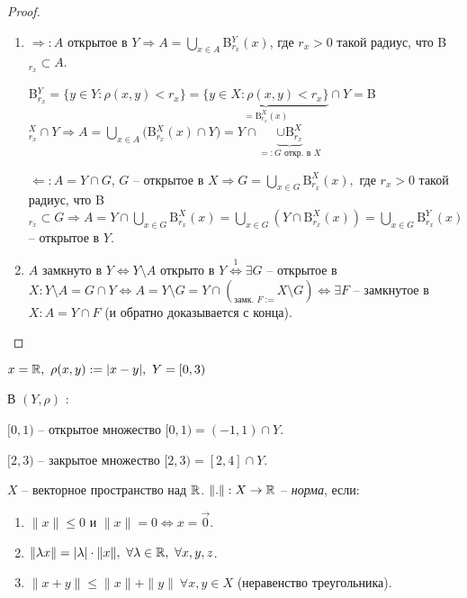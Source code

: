 \begin{proof}
    \begin{enumerate}
        \item $\Rightarrow:A$ открытое в $Y\Rightarrow A=\bigcup\limits_{x\in A}$B$_{r_x}^Y(x)$, где $r_x>0$ такой радиус, что B$_{r_x}\subset A$.

        B$_{r_x}^Y=\{y\in Y:\rho(x,y)<r_x\}=\underbrace{\{y\in X:\rho(x,y)<r_x\}}_{=\text{B}^X_{r_x}(x)}\cap Y=$B$_{r_x}^X\cap Y\Rightarrow A = \bigcup\limits_{x\in A}($B$_{r_x}^X(x)\cap Y)=Y\cap \underbrace{\cup\text{B}^X_{r_x}}_{=:G\text{ откр. в }X}$

        $\Leftarrow:A=Y\cap G$, $G$ – открытое в $X\Rightarrow G=\bigcup\limits_{x\in G}\text{B}^X_{r_x}(x),$ где $r_x>0$ такой радиус, что B$_{r_x}\subset G\Rightarrow A = Y\cap \bigcup\limits_{x\in G}\text{B}^X_{r_x}(x)=\bigcup\limits_{x\in G}(Y\cap \text{B}^X_{r_x}(x))=\bigcup\limits_{x\in G}\text{B}^Y_{r_x}(x)$ –  открытое в $Y$.

        \item $A$ замкнуто в $Y\Leftrightarrow Y\setminus A$ открыто в $Y\overset{1}{\Leftrightarrow}\exists G$ – открытое в $X:Y\setminus A=G\cap Y\Leftrightarrow A=Y\setminus G=Y\cap(\underset{\text{замк. }F:=}{}{X\setminus G})\Leftrightarrow \exists F$ – замкнутое в $X:A=Y\cap F$ (и обратно доказывается с конца).
    \end{enumerate}
\end{proof}

\begin{example}
    $x=\R,\ \rho(x,y):=|x-y|,\ Y=[0,3)$

    В $(Y, \rho)$ :

    $[0,1)$ – открытое множество $[0,1)=(-1,1)\cap Y$.

    $[2,3)$ – закрытое множество $[2,3)=[2,4]\cap Y$.
\end{example}

\begin{definition}
    $X$ – векторное пространство над $\mathbb{R}$. $\|.\|:X\rightarrow \mathbb{R}$ – \textit{норма}, если:
    \begin{enumerate}
        \item $\|x\|\leq 0$ и $\|x\|=0\Leftrightarrow x=\vec{0}$.
        \item $\|\lambda x\|=|\lambda|\cdot \|x\|,\ \forall\lambda\in \R,\  \forall x,y,z$.
        \item $\|x+y\|\leq \|x\|+ \|y\|\ \forall x,y\in X$ (неравенство треугольника).
    \end{enumerate}
\end{definition}

